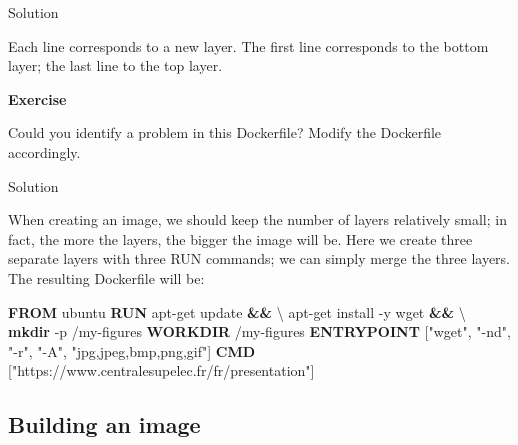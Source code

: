 \documentclass[
]{article}
\newenvironment{Shaded}{\begin{snugshade}}{\end{snugshade}}
\newcommand{\AttributeTok}[1]{\textcolor[rgb]{0.13,0.29,0.53}{#1}}
\newcommand{\DataTypeTok}[1]{\textcolor[rgb]{0.13,0.29,0.53}{#1}}
\newcommand{\ExtensionTok}[1]{#1}
\newcommand{\FunctionTok}[1]{\textcolor[rgb]{0.13,0.29,0.53}{\textbf{#1}}}
\newcommand{\KeywordTok}[1]{\textcolor[rgb]{0.13,0.29,0.53}{\textbf{#1}}}
\newcommand{\NormalTok}[1]{#1}
\newcommand{\StringTok}[1]{\textcolor[rgb]{0.31,0.60,0.02}{#1}}
\newenvironment{infobox}[1]
  {
  \begin{itemize}
  \renewcommand{\labelitemi}{
    \raisebox{-.7\height}[0pt][0pt]{
      
    }
  }
  \setlength{\fboxsep}{1em}
  \begin{whitebox}
  \item
  }
  {
  \end{whitebox}
  \end{itemize}
  }
\theoremstyle{definition}
\theoremstyle{definition}
\theoremstyle{definition}
\theoremstyle{remark}
\let\BeginKnitrBlock\begin \let\EndKnitrBlock\end
\begin{document}
Solution

\begin{infobox}{exercisebox}
Each line corresponds to a new layer.
The first line corresponds to the bottom layer;
the last line to the top layer.

\end{infobox}

\begin{infobox}{exercisebox}

\textbf{Exercise}

\BeginKnitrBlock{exercise}
\label{exr:dockerfile-creation}{\label{exr:dockerfile-creation} }Could you identify a problem in this Dockerfile?
Modify the Dockerfile accordingly.
\EndKnitrBlock{exercise}

\end{infobox}

Solution

\begin{infobox}{exercisebox}

When creating an image, we should keep the number of layers relatively
small; in fact, the more the layers, the bigger the image will be.
Here we create three separate layers with three RUN commands; we can
simply merge the three layers.
The resulting Dockerfile will be:

\begin{Shaded}
\begin{Highlighting}[]
\KeywordTok{FROM}\NormalTok{ ubuntu}
\KeywordTok{RUN} \ExtensionTok{apt{-}get}\NormalTok{ update }\KeywordTok{\&\&} \DataTypeTok{\textbackslash{}}
    \ExtensionTok{apt{-}get}\NormalTok{ install }\AttributeTok{{-}y}\NormalTok{ wget }\KeywordTok{\&\&} \DataTypeTok{\textbackslash{}}
    \FunctionTok{mkdir} \AttributeTok{{-}p}\NormalTok{ /my{-}figures}
\KeywordTok{WORKDIR}\NormalTok{ /my{-}figures}
\KeywordTok{ENTRYPOINT}\NormalTok{ [}\StringTok{"wget"}\NormalTok{, }\StringTok{"{-}nd"}\NormalTok{, }\StringTok{"{-}r"}\NormalTok{, }\StringTok{"{-}A"}\NormalTok{, }\StringTok{"jpg,jpeg,bmp,png,gif"}\NormalTok{]}
\KeywordTok{CMD}\NormalTok{ [}\StringTok{"https://www.centralesupelec.fr/fr/presentation"}\NormalTok{]}
\end{Highlighting}
\end{Shaded}

\end{infobox}

\subsection{Building an image}\label{building-an-image}
\end{document}

